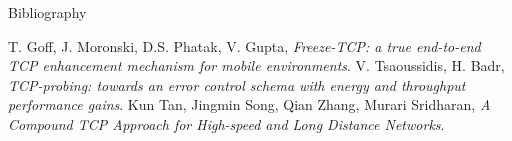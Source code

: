 \begin{frame}{Bibliography}
	\begin{thebibliography}{10}    
  	\beamertemplatearticlebibitems
    		T. Goff, J. Moronski, D.S. Phatak, V. Gupta,
		\textit{Freeze-TCP: a true end-to-end TCP enhancement mechanism for 
			  mobile environments}.
		V. Tsaoussidis, H. Badr,
		\textit{TCP-probing: towards an error control schema with energy 
		and throughput performance gains}.
		Kun Tan, Jingmin Song, Qian Zhang, Murari Sridharan,
		\textit{A Compound TCP Approach for High-speed and Long Distance Networks}.		
	\end{thebibliography}
\end{frame}
